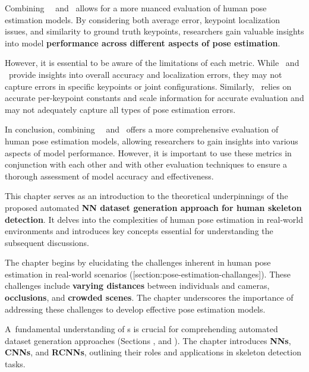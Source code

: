 Combining \OKS\, \APE\ and \MSE\ allows for a more nuanced evaluation of human pose estimation models. By considering both average error, keypoint localization issues, and similarity to ground truth keypoints, researchers gain valuable insights into model {\bf performance across different aspects of pose estimation}.

However, it is essential to be aware of the limitations of each metric. While \APE\ and \MSE\ provide insights into overall accuracy and localization errors, they may not capture errors in specific keypoints or joint configurations. Similarly, \OKS\ relies on accurate per-keypoint constants and scale information for accurate evaluation and may not adequately capture all types of pose estimation errors.

In conclusion, combining \OKS\, \APE\ and \MSE\ offers a more comprehensive evaluation of human pose estimation models, allowing researchers to gain insights into various aspects of model performance. However, it is important to use these metrics in conjunction with each other and with other evaluation techniques to ensure a thorough assessment of model accuracy and effectiveness.

This chapter serves as an introduction to the theoretical underpinnings of the proposed automated {\bf NN dataset generation approach for human skeleton detection}. It delves into the complexities of human pose estimation in real-world environments and introduces key concepts essential for understanding the subsequent discussions.


The chapter begins by elucidating the challenges inherent in human pose estimation in real-world scenarios ([section:pose-estimation-challanges]). These challenges include {\bf varying distances} between individuals and cameras, {\bf occlusions}, and {\bf crowded scenes}. The chapter underscores the importance of addressing these challenges to develop effective pose estimation models.


A~fundamental understanding of \NN\-s is crucial for comprehending automated dataset generation approaches (Sections \in[section:nn],  and ). The chapter introduces {\bf NNs}, {\bf CNNs}, and {\bf RCNNs}, outlining their roles and applications in skeleton detection tasks.

